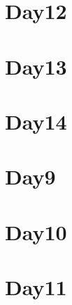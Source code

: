 
\section*{Day12}

\vfill
\section*{Day13}

\vfill
\section*{Day14}

\vfill
\section*{Day9}

\vfill
\section*{Day10}

\vfill
\section*{Day11}

\vfill
